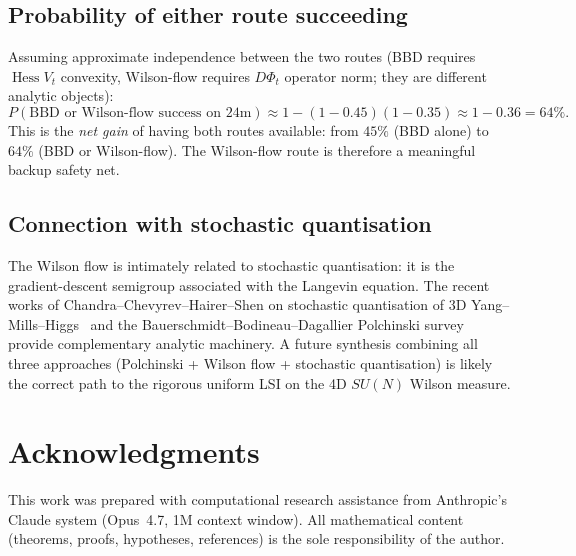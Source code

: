 \documentclass[11pt,a4paper]{amsart}
\theoremstyle{definition}
\DeclareMathOperator{\Hess}{Hess}
\begin{document}
\subsection{Probability of either route succeeding}
Assuming approximate independence between the two routes (BBD requires
$\Hess V_t$ convexity, Wilson-flow requires $D\Phi_t$ operator norm;
they are different analytic objects):
$$
P(\text{BBD or Wilson-flow success on 24m})
\approx 1 - (1-0.45)(1-0.35) \approx 1 - 0.36 = 64\%.
$$
This is the \emph{net gain} of having both routes available: from
$45\%$ (BBD alone) to $64\%$ (BBD or Wilson-flow). The
Wilson-flow route is therefore a meaningful backup safety net.

\subsection{Connection with stochastic quantisation}
The Wilson flow is intimately related to stochastic quantisation: it
is the gradient-descent semigroup associated with the Langevin
equation. The recent works of Chandra--Chevyrev--Hairer--Shen on
stochastic quantisation of 3D Yang--Mills--Higgs~\cite{ChandraChevyrevHairerShen2024}
and the Bauerschmidt--Bodineau--Dagallier Polchinski survey
\cite{BauerschmidtBodineauDagallier2024} provide complementary
analytic machinery. A future synthesis combining all three approaches
(Polchinski + Wilson flow + stochastic quantisation) is likely the
correct path to the rigorous uniform LSI on the 4D $SU(N)$ Wilson
measure.

\section*{Acknowledgments}
This work was prepared with computational research assistance from
Anthropic's Claude system (Opus~4.7, 1M context window). All
mathematical content (theorems, proofs, hypotheses, references) is
the sole responsibility of the author.
\end{document}
